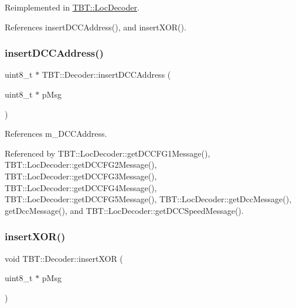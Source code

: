 Reimplemented in \hyperlink{classTBT_1_1LocDecoder_a00361e87af456a020bc6ec16c08237ef_a00361e87af456a020bc6ec16c08237ef}{T\+B\+T\+::\+Loc\+Decoder}.



References insert\+D\+C\+C\+Address(), and insert\+X\+O\+R().

\mbox{\label{classTBT_1_1Decoder_a67cd8a5abe038afee52578f483b3d4e5_a67cd8a5abe038afee52578f483b3d4e5}} 
\subsubsection{\texorpdfstring{insert\+D\+C\+C\+Address()}{insertDCCAddress()}}
{\footnotesize\ttfamily uint8\+\_\+t $\ast$ T\+B\+T\+::\+Decoder\+::insert\+D\+C\+C\+Address (\begin{DoxyParamCaption}\item[{uint8\+\_\+t $\ast$}]{p\+Msg }\end{DoxyParamCaption})\hspace{0.3cm}{\ttfamily [protected]}}



References m\+\_\+\+D\+C\+C\+Address.



Referenced by T\+B\+T\+::\+Loc\+Decoder\+::get\+D\+C\+C\+F\+G1\+Message(), T\+B\+T\+::\+Loc\+Decoder\+::get\+D\+C\+C\+F\+G2\+Message(), T\+B\+T\+::\+Loc\+Decoder\+::get\+D\+C\+C\+F\+G3\+Message(), T\+B\+T\+::\+Loc\+Decoder\+::get\+D\+C\+C\+F\+G4\+Message(), T\+B\+T\+::\+Loc\+Decoder\+::get\+D\+C\+C\+F\+G5\+Message(), T\+B\+T\+::\+Loc\+Decoder\+::get\+Dcc\+Message(), get\+Dcc\+Message(), and T\+B\+T\+::\+Loc\+Decoder\+::get\+D\+C\+C\+Speed\+Message().

\mbox{\label{classTBT_1_1Decoder_aa57b9aaf222878861d93a8234a614b5d_aa57b9aaf222878861d93a8234a614b5d}} 
\subsubsection{\texorpdfstring{insert\+X\+O\+R()}{insertXOR()}}
{\footnotesize\ttfamily void T\+B\+T\+::\+Decoder\+::insert\+X\+OR (\begin{DoxyParamCaption}\item[{uint8\+\_\+t $\ast$}]{p\+Msg }\end{DoxyParamCaption})\hspace{0.3cm}{\ttfamily [protected]}}



